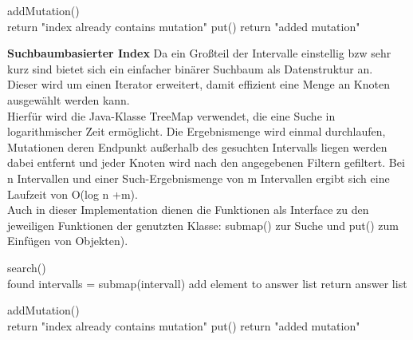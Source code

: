 \documentclass[]{article}
\begin{document}
\begin{algorithm}
addMutation()\\{
{return "index already contains mutation"\;}
put()\;
return "added mutation"\;
}
\end{algorithm}

\newpage
\textbf{Suchbaumbasierter Index}
Da ein Großteil der Intervalle einstellig bzw sehr kurz sind bietet sich ein einfacher binärer Suchbaum als Datenstruktur an.\\
Dieser wird um einen Iterator erweitert, damit effizient eine Menge an Knoten ausgewählt werden kann.\\
Hierfür wird die Java-Klasse TreeMap verwendet, die eine Suche in logarithmischer Zeit ermöglicht. Die Ergebnismenge wird einmal durchlaufen, Mutationen deren Endpunkt außerhalb des gesuchten Intervalls liegen werden dabei entfernt und jeder Knoten wird nach den angegebenen Filtern gefiltert. Bei n Intervallen und einer Such-Ergebnismenge von m Intervallen ergibt sich eine Laufzeit von O(log n +m).\\
Auch in dieser Implementation dienen die Funktionen als Interface zu den jeweiligen Funktionen der genutzten Klasse: submap() zur Suche und put() zum Einfügen von Objekten).
\begin{algorithm}
search()\\{
found intervalls = submap(intervall)\;
{
{
{add element to answer list\;}
}
return answer list\;
}
}
\end{algorithm}


\begin{algorithm}
addMutation()\\{
{return "index already contains mutation"\;}
put()\;
return "added mutation"\;
}
\end{algorithm}
\end{document}

